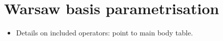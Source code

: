 \chapter{Warsaw basis parametrisation}\label{app:smeft_parametrisation}

\begin{itemize}
    \item Details on included operators: point to main body table.
\end{itemize}